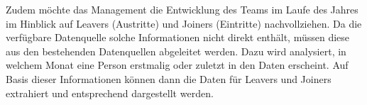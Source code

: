 Zudem möchte das Management die Entwicklung des Teams im Laufe des Jahres im Hinblick auf Leavers (Austritte) und Joiners (Eintritte) nachvollziehen. Da die verfügbare Datenquelle solche Informationen nicht direkt enthält, müssen diese aus den bestehenden Datenquellen abgeleitet werden. Dazu wird analysiert, in welchem Monat eine Person erstmalig oder zuletzt in den Daten erscheint. Auf Basis dieser Informationen können dann die Daten für Leavers und Joiners extrahiert und entsprechend dargestellt werden.